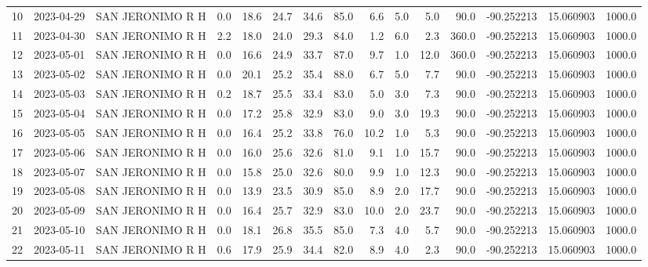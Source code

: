 \documentclass[12pt]{article}
\begin{document}
\begin{center}
\begin{tabular}{lllrrrrrrrrrrrr}
10  & 2023-04-29 &  SAN JERONIMO R H &     0.0 &  18.6 &   24.7 &  34.6 &     85.0 &        6.6 &  5.0 &         5.0 &        90.0 & -90.252213 &  15.060903 &   1000.0 \\
11  & 2023-04-30 &  SAN JERONIMO R H &     2.2 &  18.0 &   24.0 &  29.3 &     84.0 &        1.2 &  6.0 &         2.3 &       360.0 & -90.252213 &  15.060903 &   1000.0 \\
12  & 2023-05-01 &  SAN JERONIMO R H &     0.0 &  16.6 &   24.9 &  33.7 &     87.0 &        9.7 &  1.0 &        12.0 &       360.0 & -90.252213 &  15.060903 &   1000.0 \\
13  & 2023-05-02 &  SAN JERONIMO R H &     0.0 &  20.1 &   25.2 &  35.4 &     88.0 &        6.7 &  5.0 &         7.7 &        90.0 & -90.252213 &  15.060903 &   1000.0 \\
14  & 2023-05-03 &  SAN JERONIMO R H &     0.2 &  18.7 &   25.5 &  33.4 &     83.0 &        5.0 &  3.0 &         7.3 &        90.0 & -90.252213 &  15.060903 &   1000.0 \\
15  & 2023-05-04 &  SAN JERONIMO R H &     0.0 &  17.2 &   25.8 &  32.9 &     83.0 &        9.0 &  3.0 &        19.3 &        90.0 & -90.252213 &  15.060903 &   1000.0 \\
16  & 2023-05-05 &  SAN JERONIMO R H &     0.0 &  16.4 &   25.2 &  33.8 &     76.0 &       10.2 &  1.0 &         5.3 &        90.0 & -90.252213 &  15.060903 &   1000.0 \\
17  & 2023-05-06 &  SAN JERONIMO R H &     0.0 &  16.0 &   25.6 &  32.6 &     81.0 &        9.1 &  1.0 &        15.7 &        90.0 & -90.252213 &  15.060903 &   1000.0 \\
18  & 2023-05-07 &  SAN JERONIMO R H &     0.0 &  15.8 &   25.0 &  32.6 &     80.0 &        9.9 &  1.0 &        12.3 &        90.0 & -90.252213 &  15.060903 &   1000.0 \\
19  & 2023-05-08 &  SAN JERONIMO R H &     0.0 &  13.9 &   23.5 &  30.9 &     85.0 &        8.9 &  2.0 &        17.7 &        90.0 & -90.252213 &  15.060903 &   1000.0 \\
20  & 2023-05-09 &  SAN JERONIMO R H &     0.0 &  16.4 &   25.7 &  32.9 &     83.0 &       10.0 &  2.0 &        23.7 &        90.0 & -90.252213 &  15.060903 &   1000.0 \\
21  & 2023-05-10 &  SAN JERONIMO R H &     0.0 &  18.1 &   26.8 &  35.5 &     85.0 &        7.3 &  4.0 &         5.7 &        90.0 & -90.252213 &  15.060903 &   1000.0 \\
22  & 2023-05-11 &  SAN JERONIMO R H &     0.6 &  17.9 &   25.9 &  34.4 &     82.0 &        8.9 &  4.0 &         2.3 &        90.0 & -90.252213 &  15.060903 &   1000.0 \\

\end{tabular}
\end{center}
\end{document}
